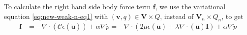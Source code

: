 \documentclass{amsart}
\begin{document}
To calculate the right hand side body force term $\boldsymbol{f}$, we use the variational equation \eqref{eq:new-weak-n-eq1} with $(\boldsymbol{v}, q) \in \boldsymbol{V} \times Q$, instead of $\boldsymbol{V}_n \times Q_n$, to get
\begin{align}
\label{f}	\boldsymbol{f} &= -\nabla \cdot \left(\boldsymbol{\mathcal{C}}\epsilon(\boldsymbol{\dot{u}})\right) + \alpha \nabla \dot{p}= -\nabla \cdot \left(2\mu \epsilon(\boldsymbol{\dot{u}}) + \lambda \nabla \cdot(\boldsymbol{\dot{u}}) \boldsymbol{I} \right) + \alpha \nabla \dot{p}
	\\

\end{align}
\end{document}
